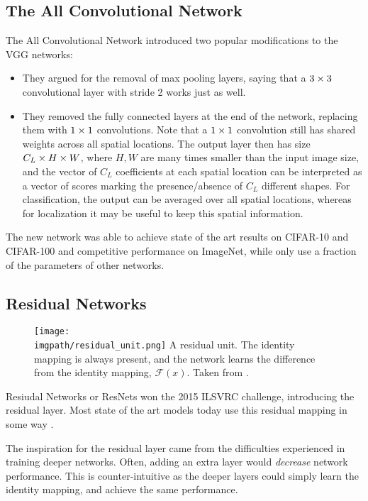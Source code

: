 \subsection{The All Convolutional Network}
The All Convolutional Network \cite{springenberg_striving_2015} introduced two
popular modifications to the VGG networks:
%
\begin{itemize}
  \item They argued for the removal of max pooling layers, saying that a $3\times 3$
    convolutional layer with stride 2 works just as well.
  \item They removed the fully connected layers at the end of the network,
    replacing them with $1\times 1$ convolutions. Note that a $1\times 1$ convolution
    still has shared weights across all spatial locations. The output layer then
    has size $C_L \times H \times W$, where $H, W$ are many times smaller than the input
    image size, and the vector of $C_L$ coefficients at each spatial location
    can be interpreted as a vector of scores marking the presence/absence of
    $C_L$ different shapes. For classification, the output can be averaged over
    all spatial locations, whereas for localization it may be useful to keep
    this spatial information.
\end{itemize}
The new network was able to achieve state of the art results on CIFAR-10 and
CIFAR-100 and competitive performance on ImageNet, while only use a fraction of
the parameters of other networks.

\subsection{Residual Networks}\label{sec:ch2:resnets}
  \begin{figure}[tb]
    \centering
    \texttt{[image: \\imgpath/residual\_unit.png]}
          {A residual unit. The identity mapping is always present, and the
            network learns the difference from the identity mapping, $\mathcal{F}(x)$.
            Taken from \cite{he_deep_2016}.}
      \label{fig:ch2:residual_unit}
  \end{figure}
  Resiudal Networks or ResNets won the 2015 ILSVRC challenge, introducing the
  residual layer. Most state of the art models today use this residual mapping
  in some way \cite{zagoruyko_wide_2016, xie_aggregated_2017}.

  The inspiration for the residual layer came from the difficulties
  experienced in training deeper networks. Often, adding an extra layer would
  \emph{decrease} network performance. This is counter-intuitive as the deeper
  layers could simply learn the identity mapping, and achieve the same
  performance.

